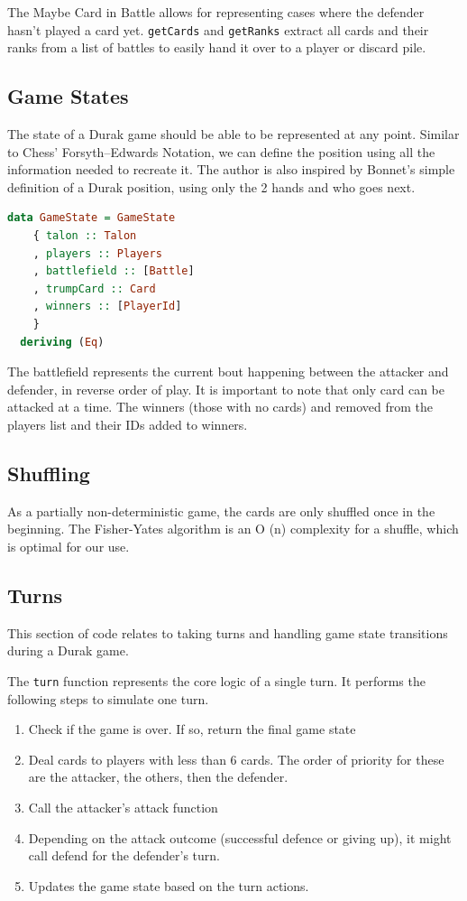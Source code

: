 \documentclass[a4paper, twoside, 12pt]{report}
\begin{document}
The Maybe Card in Battle allows for representing cases where the defender hasn't played a card yet. \verb|getCards| and \verb|getRanks|  extract all cards and their ranks from a list of battles to easily hand it over to a player or discard pile.

\subsection{Game States}

The state of a Durak game should be able to be represented at any point. Similar to Chess' Forsyth–Edwards Notation, we can define the position using all the information needed to recreate it. The author is also inspired by Bonnet's simple definition of a Durak position, using only the 2 hands and who goes next.

\begin{lstlisting}[language=Haskell]
	data GameState = GameState
	{ talon :: Talon
	, players :: Players
	, battlefield :: [Battle]
	, trumpCard :: Card
	, winners :: [PlayerId]
	}
  deriving (Eq)
\end{lstlisting}

The battlefield represents the current bout happening between the attacker and defender, in reverse order of play. It is important to note that only card can be attacked at a time. The winners (those with no cards) and removed from the players list and their IDs added to winners.

\subsection{Shuffling}

As a partially non-deterministic game, the cards are only shuffled once in the beginning. The Fisher-Yates algorithm\cite{fisheryates} is an O (n) complexity for a shuffle, which is optimal for our use.

\subsection{Turns}

This section of code relates to taking turns and handling game state transitions during a Durak game.

The \verb|turn| function represents the core logic of a single turn. It performs the following steps to simulate one turn.

\begin{enumerate}
	\item Check if the game is over. If so, return the final game state
	\item Deal cards to players with less than 6 cards. The order of priority for these are the attacker, the others, then the defender.
	\item Call the attacker's attack function
	\item Depending on the attack outcome (successful defence or giving up), it might call defend for the defender's turn.
	\item Updates the game state based on the turn actions.
\end{enumerate}
\end{document}
